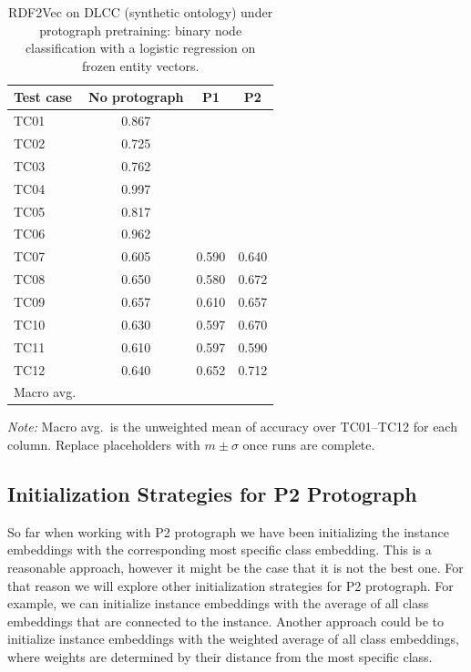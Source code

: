 \documentclass[a4paper,oneside,bibliography=totoc]{scrartcl}
\begin{document}
\begingroup
\newcommand{\D}{\textemdash{}}
\begin{table}[t]
  \centering
  \caption{RDF2Vec on DLCC (synthetic ontology) under protograph pretraining: binary node classification with a logistic regression on frozen entity vectors.}
  \label{tab:dlcc-rdf2vec-protograph}
  \footnotesize
  \setlength{\tabcolsep}{4pt}
  \begin{tabular}{@{}lccc@{}}
    \toprule
    Test case
      & No protograph
      & P1
      & P2 \\
    \midrule
    TC01 & 0.867 & \D & \D \\
    TC02 & 0.725 & \D & \D \\
    TC03 & 0.762 & \D & \D \\
    TC04 & 0.997 & \D & \D \\ %
    TC05 & 0.817 & \D & \D \\
    TC06 & 0.962 & \D & \D \\
    TC07 & 0.605 & 0.590 & 0.640 \\
    TC08 & 0.650 & 0.580 & 0.672 \\
    TC09 & 0.657 & 0.610 & 0.657 \\
    TC10 & 0.630 & 0.597 & 0.670 \\
    TC11 & 0.610 & 0.597 & 0.590 \\
    TC12 & 0.640 & 0.652 & 0.712 \\
    \midrule
    Macro avg.
      & \D & \D & \D \\
    \bottomrule
  \end{tabular}
  \vspace{0.4em}
  \par\noindent\small\textit{Note:} Macro avg.\ is the unweighted mean of accuracy over TC01--TC12 for each column. Replace placeholders with $m \pm \sigma$ once runs are complete.
\end{table}
\endgroup

\subsection{Initialization Strategies for P2 Protograph}
So far when working with P2 protograph we have been initializing the instance embeddings with the corresponding most specific class embedding.
This is a reasonable approach, however it might be the case that it is not the best one.
For that reason we will explore other initialization strategies for P2 protograph.
For example, we can initialize instance embeddings with the average of all class embeddings that are connected to the instance. 
Another approach could be to initialize instance embeddings with the weighted average of all class embeddings, where weights are determined by their distance from the most specific class.
\end{document}
